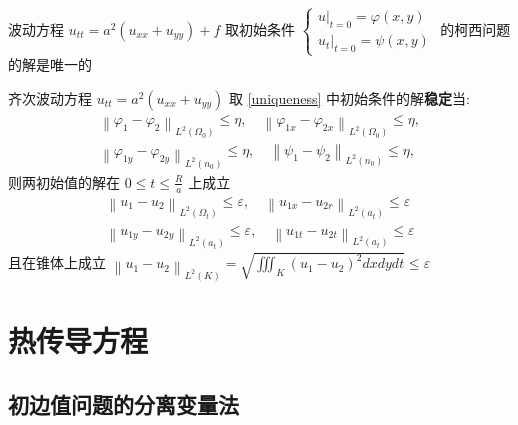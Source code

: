 \documentclass[10pt]{yerbaformat}
\begin{document}
\begin{theorem}
    波动方程 $u_{tt}=a^{2}\left(u_{xx}+u_{y y}\right)+f$ 取初始条件 $\left\{\begin{array}{l}\left.u\right|_{t=0}=\varphi(x, y) \\ \left.u_{t}\right|_{t=0}=\psi(x, y)\end{array}\right.$ 的柯西问题的解是唯一的 \label{uniqueness}
\end{theorem}

\begin{theorem}
    齐次波动方程 $u_{tt}=a^{2}\left(u_{xx}+u_{y y}\right)$ 取 \ref{uniqueness} 中初始条件的解\textbf{稳定}当:
    $$
        \begin{array}{l}
            \left\|\varphi_{1}-\varphi_{2}\right\|_{L^{2}\left(\Omega_{0}\right)} \leqslant \eta, \quad\left\|\varphi_{1 x}-\varphi_{2 x}\right\|_{L^{2}\left(\Omega_{0}\right)} \leqslant \eta, \\
            \left\|\varphi_{1 y}-\varphi_{2 y}\right\|_{L^{2}\left(n_{0}\right)} \leqslant \eta, \quad\left\|\psi_{1}-\psi_{2}\right\|_{L^{2}\left(n_{0}\right)} \leqslant \eta,
        \end{array}
    $$
    则两初始值的解在 $0 \leqslant t \leqslant \frac{R}{a}$ 上成立
    $$
        \begin{array}{l}
            \left\|u_{1}-u_{2}\right\|_{L^{2}\left(\Omega_{t}\right)} \leqslant \varepsilon, \quad\left\|u_{1 x}-u_{2 r}\right\|_{L^{2}\left(a_{t}\right)} \leqslant \varepsilon \\
            \left\|u_{1 y}-u_{2 y}\right\|_{L^{2}\left(a_{t}\right)} \leqslant \varepsilon, \quad\left\|u_{1 t}-u_{2 t}\right\|_{L^{2}\left(a_{t}\right)} \leqslant \varepsilon
        \end{array}
    $$
    且在锥体上成立 $\left\|u_{1}-u_{2}\right\|_{L^{2}(K)}=\sqrt{\iiint_{K}\left(u_{1}-u_{2}\right)^{2} d x d y d t} \leqslant \varepsilon$
\end{theorem}

\section{热传导方程}

\subsection{初边值问题的分离变量法}
\end{document}
